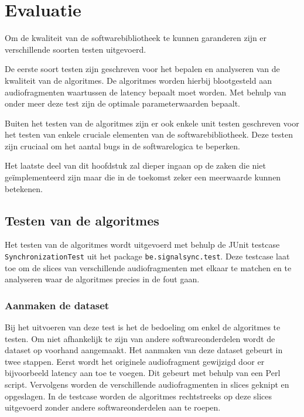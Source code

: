 \chapter{Evaluatie}
\label{evaluatie}

Om de kwaliteit van de softwarebibliotheek te kunnen garanderen zijn er verschillende soorten testen uitgevoerd. 

De eerste soort testen zijn geschreven voor het bepalen en analyseren van de kwaliteit van de algoritmes. De algoritmes worden hierbij blootgesteld aan audiofragmenten waartussen de latency bepaalt moet worden. Met behulp van onder meer deze test zijn de optimale parameterwaarden bepaalt.

Buiten het testen van de algoritmes zijn er ook enkele unit testen geschreven voor het testen van enkele cruciale elementen van de softwarebibliotheek. Deze testen zijn cruciaal om het aantal bugs in de softwarelogica te beperken.

Het laatste deel van dit hoofdstuk zal dieper ingaan op de zaken die niet geïmplementeerd zijn maar die in de toekomst zeker een meerwaarde kunnen betekenen.


\section{Testen van de algoritmes}

Het testen van de algoritmes wordt uitgevoerd met behulp de JUnit testcase \texttt{SynchronizationTest} uit het package \texttt{be.signalsync.test}. Deze testcase laat toe om de slices van verschillende audiofragmenten met elkaar te matchen en te analyseren waar de algoritmes precies in de fout gaan.

\subsection{Aanmaken de dataset}

Bij het uitvoeren van deze test is het de bedoeling om enkel de algoritmes te testen. Om niet afhankelijk te zijn van andere softwareonderdelen wordt de dataset op voorhand aangemaakt. Het aanmaken van deze dataset gebeurt in twee stappen. Eerst wordt het originele audiofragment gewijzigd door er bijvoorbeeld latency aan toe te voegen. Dit gebeurt met behulp van een Perl script. Vervolgens worden de verschillende audiofragmenten in slices geknipt en opgeslagen. In de testcase worden de algoritmes rechtstreeks op deze slices uitgevoerd zonder andere softwareonderdelen aan te roepen.

